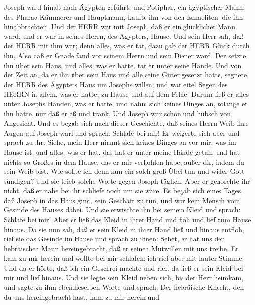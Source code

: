  Joseph ward hinab nach Ägypten geführt; und Potiphar, ein
ägyptischer Mann, des Pharao Kämmerer und Hauptmann, kaufte ihn von den
Ismaeliten, die ihn hinabbrachten.  Und der HERR war mit
Joseph, daß er ein glücklicher Mann ward; und er war in seines Herrn,
des Ägypters, Hause.  Und sein Herr sah, daß der HERR mit
ihm war; denn alles, was er tat, dazu gab der HERR Glück durch ihn,
 Also daß er Gnade fand vor seinem Herrn und sein Diener
ward. Der setzte ihn über sein Haus, und alles, was er hatte, tat er
unter seine Hände.  Und von der Zeit an, da er ihn über sein
Haus und alle seine Güter gesetzt hatte, segnete der HERR des Ägypters
Haus um Josephs willen; und war eitel Segen des HERRN in allem, was er
hatte, zu Hause und auf dem Felde.  Darum ließ er alles
unter Josephs Händen, was er hatte, und nahm sich keines Dinges an,
solange er ihn hatte, nur daß er aß und trank. Und Joseph war schön und
hübsch von Angesicht.  Und es begab sich nach dieser
Geschichte, daß seines Herrn Weib ihre Augen auf Joseph warf und sprach:
Schlafe bei mir!  Er weigerte sich aber und sprach zu ihr:
Siehe, mein Herr nimmt sich keines Dinges an vor mir, was im Hause ist,
und alles, was er hat, das hat er unter meine Hände getan, 
und hat nichts so Großes in dem Hause, das er mir verhohlen habe, außer
dir, indem du sein Weib bist. Wie sollte ich denn nun ein solch groß
Übel tun und wider Gott sündigen?  Und sie trieb solche
Worte gegen Joseph täglich. Aber er gehorchte ihr nicht, daß er nahe bei
ihr schliefe noch um sie wäre.  Es begab sich eines Tages,
daß Joseph in das Haus ging, sein Geschäft zu tun, und war kein Mensch
vom Gesinde des Hauses dabei.  Und sie erwischte ihn bei
seinem Kleid und sprach: Schlafe bei mir! Aber er ließ das Kleid in
ihrer Hand und floh und lief zum Hause hinaus.  Da sie nun
sah, daß er sein Kleid in ihrer Hand ließ und hinaus entfloh,
 rief sie das Gesinde im Hause und sprach zu ihnen: Sehet,
er hat uns den hebräischen Mann hereingebracht, daß er seinen Mutwillen
mit uns treibe. Er kam zu mir herein und wollte bei mir schlafen; ich
rief aber mit lauter Stimme.  Und da er hörte, daß ich ein
Geschrei machte und rief, da ließ er sein Kleid bei mir und lief hinaus.
 Und sie legte sein Kleid neben sich, bis der Herr heimkam,
 und sagte zu ihm ebendieselben Worte und sprach: Der
hebräische Knecht, den du uns hereingebracht hast, kam zu mir herein und
